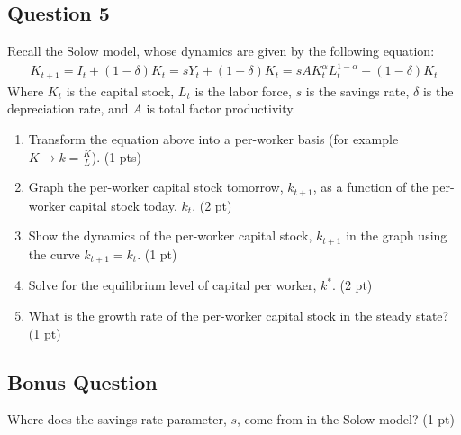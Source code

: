 \documentclass[11pt]{article}
\begin{document}
\subsection*{Question 5}
Recall the Solow model, whose dynamics are given by the following equation:
\begin{align}
    K_{t+1} =I_t + (1-\delta)K_t =sY_t + (1-\delta)K_t = sA K_t^{\alpha}L_t^{1-\alpha} + (1-\delta)K_t
\end{align}
Where \(K_t\) is the capital stock, \(L_t\) is the labor force, \(s\) is the savings rate, \(\delta\) is the depreciation rate, and \(A\) 
is total factor productivity.

\begin{enumerate}
    \item Transform the equation above into a per-worker basis 
    (for example \(K \to k=\frac{K}{L}\)). (1 pts)
    \item Graph the per-worker capital stock tomorrow, \(k_{t+1}\), as a function of the per-worker 
    capital stock today, \(k_t\). (2 pt)
    \item Show the dynamics of the per-worker capital stock, \(k_{t+1}\) in the graph using the curve 
    \(k_{t+1} = k_t\). (1 pt)
    \item Solve for the equilibrium level of capital per worker, \(k^*\). (2 pt)
    \item What is the growth rate of the per-worker capital stock in the steady state? (1 pt)
\end{enumerate}

\subsection{ Bonus Question}
Where does the savings rate parameter, \(s\), come from in the Solow model? (1 pt)
\end{document}
